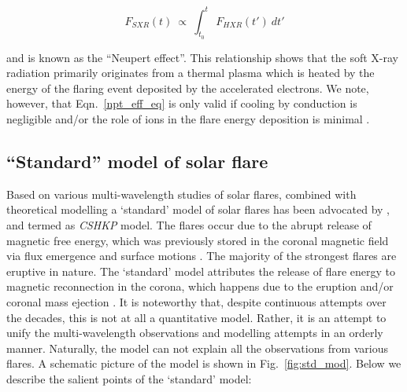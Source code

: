 \begin{equation}\label{npt_eff_eq}
    F_{SXR}(t)~\propto~\int_{t_{0}}^{t}~F_{HXR}(t')~dt'
\end{equation}

\noindent and is known as the ``Neupert effect''. This relationship shows that the soft X-ray radiation primarily originates from a thermal plasma which is heated by the energy of the flaring event deposited by the accelerated electrons. We note, however, that Eqn.~\ref{npt_eff_eq} is only valid if cooling by conduction is negligible and/or the role of ions in the flare energy deposition is minimal \citep{veronig05}.

\subsection{``Standard'' model of solar flare}\label{sol_flr_std_mod}

Based on various multi-wavelength studies of solar flares, combined with theoretical modelling a `standard' model of solar flares has been advocated by \cite{carmichael64,sturrock66,hirayama74,kopp76}, and termed as \textsl{CSHKP} model. The flares occur due to the abrupt release of magnetic free energy, which was previously stored in the coronal magnetic field via flux emergence and surface motions \citep{forbes06}. The majority of the strongest flares are eruptive in nature. The `standard' model attributes the release of flare energy to magnetic reconnection in the corona, which happens due to the eruption and/or coronal mass ejection \citep{shibata95,lin_n_forbes00,moore01,priest_n_forbes02}. It is noteworthy that, despite continuous attempts over the decades, this is not at all a quantitative model. Rather, it is an attempt to unify the multi-wavelength observations and modelling attempts in an orderly manner. Naturally, the model can not explain all the observations from various flares. A schematic picture of the model is shown in Fig.~\ref{fig:std_mod}. Below we describe the salient points of the `standard' model:

